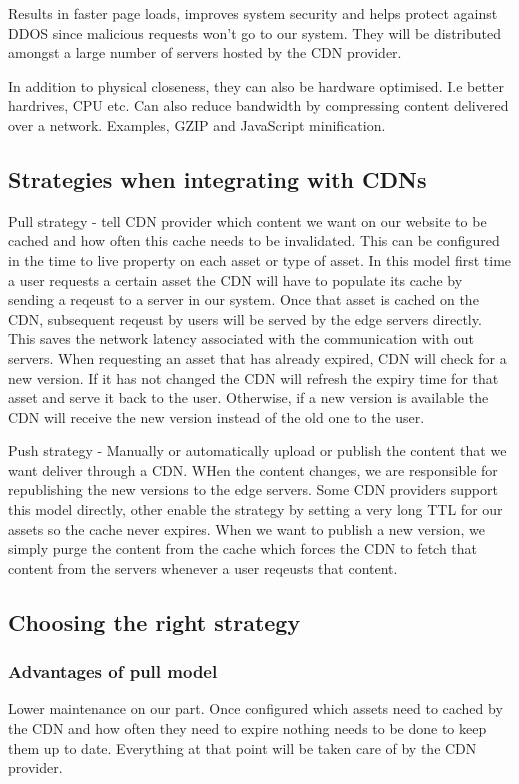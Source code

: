 \documentclass[a4paper, 11pt]{book}
\begin{document}
    Results in faster page loads, improves system security and helps protect against DDOS since malicious requests won't go to our system.
    They will be distributed amongst a large number of servers hosted by the CDN provider.

    In addition to physical closeness, they can also be hardware optimised. I.e better hardrives, CPU etc.
    Can also reduce bandwidth by compressing content delivered over a network.
    Examples, GZIP and JavaScript minification.

    \subsection{Strategies when integrating with CDNs}
    Pull strategy - tell CDN provider which content we want on our website to be cached and how often this cache needs to be invalidated.
    This can be configured in the time to live property on each asset or type of asset.
    In this model first time a user requests a certain asset the CDN will have to populate its cache by sending a reqeust to a server in our system.
    Once that asset is cached on the CDN, subsequent reqeust by users will be served by the edge servers directly.
    This saves the network latency associated with the communication with out servers.
    When requesting an asset that has already expired, CDN will check for a new version.
    If it has not changed the CDN will refresh the expiry time for that asset and serve it back to the user.
    Otherwise, if a new version is available the CDN will receive the new version instead of the old one to the user.

    Push strategy - Manually or automatically upload or publish the content that we want deliver through a CDN.
    WHen the content changes, we are responsible for republishing the new versions to the edge servers.
    Some CDN providers support this model directly, other enable the strategy by setting a very long TTL for our assets so the cache never expires.
    When we want to publish a new version, we simply purge the content from the cache which forces the CDN to fetch that content from the servers whenever a user reqeusts that content.

    \subsection{Choosing the right strategy}

    \subsubsection{Advantages of pull model}
    Lower maintenance on our part.
    Once configured which assets need to cached by the CDN and how often they need to expire nothing needs to be done to keep them up to date.
    Everything at that point will be taken care of by the CDN provider.
\end{document}
